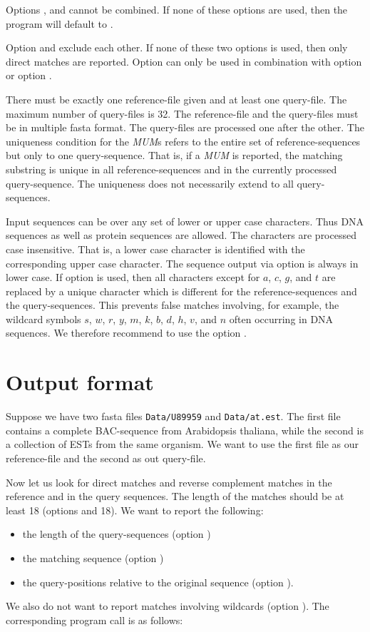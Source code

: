 \documentclass[12pt]{article}
\newcommand{\MUM}[0]{\textit{MUM}\xspace}
\begin{document}
Options ,  and
 cannot be combined. If none of these options are
used, then the program will default to .

Option  and  exclude each other. If none
of these two options is used, then only direct matches are reported.
Option  can only be used in combination with
option  or option .

There must be exactly one reference-file given and at least one
query-file. The maximum number of query-files is 32.
The reference-file and the query-files must be in multiple fasta format.
The query-files are processed one after the other. The uniqueness condition
for the \MUM{s} refers to the entire set of reference-sequences but
only to one query-sequence. That is, if a \MUM is reported, the
matching substring is unique in all reference-sequences and in the currently
processed query-sequence. The uniqueness does not necessarily extend to
all query-sequences.

Input sequences can be over any set of lower or upper case
characters. Thus DNA sequences as well as protein sequences are allowed.
The characters are processed case insensitive. That is, a 
lower case character is identified with the corresponding upper case 
character. The sequence output via option  is always
in lower case. If option  is used,
then all characters except for $a$, $c$, $g$, and $t$ are replaced by
a unique character which is different for the reference-sequences and
the query-sequences. This prevents false matches involving, for
example, the wildcard symbols $s$, $w$, $r$, $y$, $m$, $k$, $b$, 
$d$, $h$, $v$, and $n$ often occurring in DNA sequences.
We therefore recommend to use the option .

\section{Output format}
Suppose we have two fasta files \texttt{Data/U89959} and
\texttt{Data/at.est}. The first file contains a complete BAC-sequence from
Arabidopsis thaliana, while the second is a collection of 
ESTs from the same organism. We want to use the first file as our
reference-file and the second as out query-file.

Now let us look for direct matches and reverse complement
matches in the reference and in the query sequences.
The length of the matches should be at least 18 (options  
and  18). 
We want to report the following:
\begin{itemize}
\item
the length of the query-sequences (option )
\item
the matching sequence (option )
\item
the query-positions relative to the original sequence 
(option ). 
\end{itemize}
We also do not want to report matches involving wildcards 
(option ). The corresponding program call is as follows:
\end{document}
